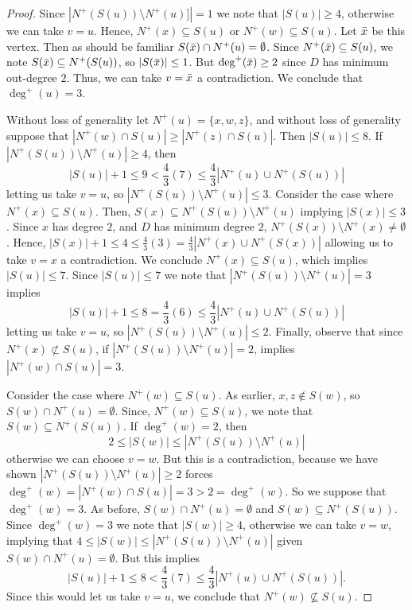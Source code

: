 \documentclass[12pt]{article}
\theoremstyle{definition}
\begin{document}
\begin{proof}
    Since $|N^+(S(u))\setminus N^+(u)]| = 1$ we note that $|S(u)|\geq 4$, otherwise we can take $v = u$.
    Hence, $N^+(x) \subseteq S(u)$ or $N^+(w) \subseteq S(u)$.
    Let $\Bar{x}$ be this vertex. Then as should be familiar $S(\Bar{x}) \cap N^+(u) = \emptyset$.
    Since $N^+(\Bar{x}) \subseteq S(u)$, we note $S(\Bar{x}) \subseteq N^+(S(u))$,
    so $|S(\Bar{x})|\leq 1$.
    But $\deg^+(\Bar{x})\geq 2$ since $D$ has minimum out-degree $2$.
    Thus, we can take $v = \Bar{x}$ a contradiction.
    We conclude that $\deg^+(u) = 3$.


    Without loss of generality let $N^+(u) = \{x,w,z\}$,
    and without loss of generality suppose that $|N^+(w)\cap S(u)|\geq |N^+(z)\cap S(u)|$.
    Then $|S(u)|\leq 8$.
    If $|N^+(S(u))\setminus N^+(u)|\geq 4$, then
    \[
    |S(u)|+1 \leq 9 < \frac{4}{3}(7) \leq \frac{4}{3}|N^+(u) \cup N^+(S(u))|
    \]
    letting us take $v = u$, so $|N^+(S(u))\setminus N^+(u)|\leq 3$.
    Consider the case where $N^+(x)\subseteq S(u)$.
    Then,  $S(x) \subseteq N^+(S(u))\setminus N^+(u)$ implying $|S(x)|\leq 3$.
    Since $x$ has degree $2$, and $D$ has minimum degree $2$, $N^+(S(x))\setminus N^+(x) \neq \emptyset$.
    Hence, 
    $|S(x)|+1 \leq 4 \leq \frac{4}{3}(3) = \frac{4}{3}|N^+(x) \cup N^+(S(x))|$
    allowing us to take $v = x$ a contradiction.
    We conclude $N^+(x)\subseteq S(u)$, which implies $|S(u)|\leq 7$.
    Since $|S(u)|\leq 7$ we note that $|N^+(S(u))\setminus N^+(u)|= 3$ implies 
    \[
    |S(u)|+1 \leq 8 = \frac{4}{3}(6) \leq \frac{4}{3}|N^+(u) \cup N^+(S(u))|
    \]
    letting us take $v = u$, so $|N^+(S(u))\setminus N^+(u)|\leq 2$.
    Finally, observe that since $N^+(x)\not\subset S(u)$, 
    if $|N^+(S(u))\setminus N^+(u)|= 2$, implies  $|N^+(w)\cap S(u)| = 3$.

    
    Consider the case where $N^+(w)\subseteq S(u)$.
    As earlier, $x,z \notin S(w)$, so $S(w) \cap N^+(u) = \emptyset$.
    Since, $N^+(w)\subseteq S(u)$, we note that $S(w)\subseteq N^+(S(u))$.
    If $\deg^+(w) = 2$, then 
    \[
    2 \leq |S(w)| \leq |N^+(S(u))\setminus N^+(u)|
    \]
    otherwise we can choose $v = w$.
    But this is a contradiction, because we have shown $|N^+(S(u))\setminus N^+(u)|\geq 2$ forces 
    $\deg^+(w) = |N^+(w)\cap S(u)| = 3> 2 = \deg^+(w)$.
    So we suppose that $\deg^+(w) = 3$.
    As before, $S(w)\cap N^+(u) = \emptyset$ and $S(w) \subseteq N^+(S(u))$.
    Since $\deg^+(w) = 3$ we note that $|S(w)|\geq 4$,
    otherwise we can take $v = w$,
    implying that
    $4 \leq |S(w)| \leq |N^+(S(u))\setminus N^+(u)|$ given $S(w) \cap N^+(u) = \emptyset$.
    But this implies 
    \[
    |S(u)| + 1 \leq 8 < \frac{4}{3}(7) \leq \frac{4}{3}|N^+(u) \cup N^+(S(u))|.
    \]
    Since this would let us take $v = u$, we conclude that $N^+(w)\not\subseteq S(u)$.


\end{proof}
\end{document}
